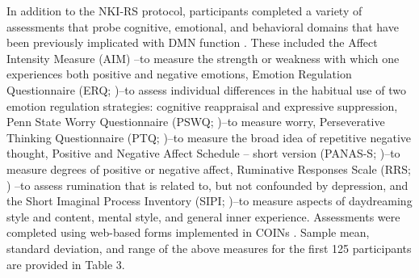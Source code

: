 In addition to the NKI-RS protocol, participants completed a variety of assessments that probe cognitive, emotional, and behavioral domains that have been previously implicated with DMN function \cite{Andrews-Hanna2014,Hamilton2011,Sheline2009,Buckner2008}. These included the Affect Intensity Measure (AIM) \cite{Larsen1986}--to measure the strength or weakness with which one experiences both positive and negative emotions, Emotion Regulation Questionnaire (ERQ; \cite{Gross2003})--to assess individual differences in the habitual use of two emotion regulation strategies: cognitive reappraisal and expressive suppression, Penn State Worry Questionnaire (PSWQ; \cite{Meyer1990})--to measure worry, Perseverative Thinking Questionnaire (PTQ; \cite{Ehring2011})--to measure the broad idea of repetitive negative thought, Positive and Negative Affect Schedule – short version (PANAS-S; \cite{Watson1988})--to measure degrees of positive or negative affect, Ruminative Responses Scale (RRS; \cite{Treynor2003}) --to assess rumination that is related to, but not confounded by depression, and the Short Imaginal Process Inventory (SIPI; \cite{Huba1981})--to measure aspects of daydreaming style and content, mental style, and general inner experience. Assessments were completed using web-based forms implemented in COINs \cite{Scott2011}. Sample mean, standard deviation, and range of the above measures for the first 125 participants are provided in Table 3.

